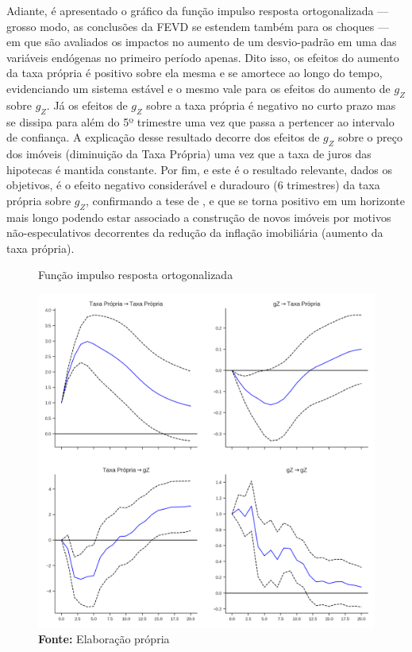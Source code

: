 Adiante, é apresentado o gráfico da função impulso resposta ortogonalizada --- grosso modo, as conclusões da FEVD se estendem também para os choques --- em que são avaliados os impactos no aumento de um desvio-padrão em uma das variáveis endógenas no primeiro período apenas. 
Dito isso, os efeitos do aumento da taxa própria é positivo sobre ela mesma e se amortece ao longo do tempo, evidenciando um sistema estável e o mesmo vale para os efeitos do aumento de $g_Z$ sobre $g_Z$. Já os efeitos de $g_Z$ sobre a taxa própria é negativo no curto prazo mas se dissipa para além do 5º trimestre uma vez que passa a pertencer ao intervalo de confiança. A explicação desse resultado decorre dos efeitos de $g_Z$ sobre o preço dos imóveis (diminuição da Taxa Própria) uma vez que a taxa de juros das hipotecas é mantida constante. Por fim, e este é o resultado relevante, dados os objetivos, é o efeito negativo considerável e duradouro (6 trimestres) da taxa própria sobre $g_Z$, confirmando a tese de \textcite{teixeira_crescimento_2015}, e que se torna positivo em um horizonte mais longo podendo estar associado a construção de novos imóveis por motivos não-especulativos decorrentes da redução da inflação imobiliária (aumento da taxa própria).


\begin{figure}[H]
	\centering
	\caption{Função impulso resposta ortogonalizada}
	\label{fevd}
	\includegraphics[width=\textwidth]{Fatos_Estilizados/Figs/Impulso_VECM.png}
	\caption*{\textbf{Fonte:} Elaboração própria}
\end{figure}

